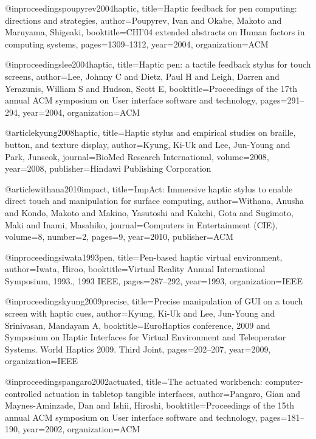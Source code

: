 @inproceedings{poupyrev2004haptic,
  title={Haptic feedback for pen computing: directions and strategies},
  author={Poupyrev, Ivan and Okabe, Makoto and Maruyama, Shigeaki},
  booktitle={CHI'04 extended abstracts on Human factors in computing systems},
  pages={1309--1312},
  year={2004},
  organization={ACM}
}

@inproceedings{lee2004haptic,
  title={Haptic pen: a tactile feedback stylus for touch screens},
  author={Lee, Johnny C and Dietz, Paul H and Leigh, Darren and Yerazunis, William S and Hudson, Scott E},
  booktitle={Proceedings of the 17th annual ACM symposium on User interface software and technology},
  pages={291--294},
  year={2004},
  organization={ACM}
}

@article{kyung2008haptic,
  title={Haptic stylus and empirical studies on braille, button, and texture display},
  author={Kyung, Ki-Uk and Lee, Jun-Young and Park, Junseok},
  journal={BioMed Research International},
  volume={2008},
  year={2008},
  publisher={Hindawi Publishing Corporation}
}

@article{withana2010impact,
  title={ImpAct: Immersive haptic stylus to enable direct touch and manipulation for surface computing},
  author={Withana, Anusha and Kondo, Makoto and Makino, Yasutoshi and Kakehi, Gota and Sugimoto, Maki and Inami, Masahiko},
  journal={Computers in Entertainment (CIE)},
  volume={8},
  number={2},
  pages={9},
  year={2010},
  publisher={ACM}
}

@inproceedings{iwata1993pen,
  title={Pen-based haptic virtual environment},
  author={Iwata, Hiroo},
  booktitle={Virtual Reality Annual International Symposium, 1993., 1993 IEEE},
  pages={287--292},
  year={1993},
  organization={IEEE}
}

@inproceedings{kyung2009precise,
  title={Precise manipulation of GUI on a touch screen with haptic cues},
  author={Kyung, Ki-Uk and Lee, Jun-Young and Srinivasan, Mandayam A},
  booktitle={EuroHaptics conference, 2009 and Symposium on Haptic Interfaces for Virtual Environment and Teleoperator Systems. World Haptics 2009. Third Joint},
  pages={202--207},
  year={2009},
  organization={IEEE}
}

@inproceedings{pangaro2002actuated,
  title={The actuated workbench: computer-controlled actuation in tabletop tangible interfaces},
  author={Pangaro, Gian and Maynes-Aminzade, Dan and Ishii, Hiroshi},
  booktitle={Proceedings of the 15th annual ACM symposium on User interface software and technology},
  pages={181--190},
  year={2002},
  organization={ACM}
}

